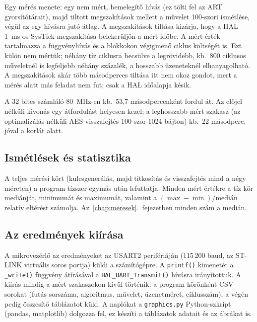 \documentclass[a4paper,12pt]{report}
\theoremstyle{definition}
\theoremstyle{remark}
\begin{document}
\medskip

Egy mérés menete: egy nem mért, bemelegítő hívás (ez tölti fel az ART gyorsítótárait), majd tiltott megszakítások mellett a művelet 100-szori ismétlése, végül az egy hívásra jutó átlag. A megszakítások tiltása kizárja, hogy a HAL 1~ms-os SysTick-megszakítása belekerüljön a mért időbe. A mért érték tartalmazza a függvényhívás és a blokkokon végigmenő ciklus költségét is. Ezt külön nem mértük; néhány tíz ciklusra becsülve a legrövidebb, kb.\ 800 ciklusos műveletnél is legfeljebb néhány százalék, a hosszabb üzeneteknél elhanyagolható. A megszakítások akár több másodperces tiltása itt nem okoz gondot, mert a mérés alatt más feladat nem fut; csak a HAL időalapja késik.

A 32 bites számláló 80~MHz-en kb.\ 53,7 másodpercenként fordul át. Az előjel nélküli kivonás egy átfordulást helyesen kezel; a leghosszabb mért szakasz (az optimalizálás nélküli AES-visszafejtés 100-szor 1024 bájton) kb.\ 22 másodperc, jóval a korlát alatt.

\subsection{Ismétlések és statisztika}

A teljes mérési kört (kulcsgenerálás, majd titkosítás és visszafejtés mind a négy méreten) a program tízszer egymás után lefuttatja. Minden mért értékre a tíz kör mediánját, minimumát és maximumát, valamint a $(\max - \min)/\text{medián}$ relatív eltérést számolja. Az~\ref{chap:meresek}.~fejezetben minden szám a medián.

\subsection{Az eredmények kiírása}

A mikrovezérlő az eredményeket az USART2 perifériáján (115\,200 baud, az ST-LINK virtuális soros portja) küldi a számítógépre. A \texttt{printf()} kimenetét a \texttt{\_write()} függvény átírásával a \texttt{HAL\_UART\_Transmit()} hívásra irányítottuk. A kiírás mindig a mért szakaszokon kívül történik: a program körönként CSV-sorokat (futás sorszáma, algoritmus, művelet, üzenetméret, ciklusszám), a végén pedig összesítő táblázatot küld. A naplókat a \texttt{graphics.py} Python-szkript (pandas, matplotlib) dolgozza fel, ez készíti a táblázatok adatait és az ábrákat is.
\end{document}
